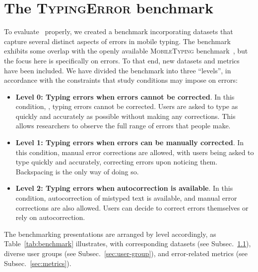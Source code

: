\section{The \textsc{TypingError} benchmark}
\label{Sec:benchmark}

To evaluate ~\name properly, we created a benchmark incorporating datasets that capture several distinct aspects of errors in mobile typing. 
The \benchmark benchmark exhibits some overlap with the  openly available \textsc{MobileTyping} benchmark~\cite{shi2024crtypist}, but the focus here is specifically on errors. 
To that end, new datasets and metrics have been included. 
We have divided the benchmark into three ``levels'', in accordance with the constraints that study conditions may impose on errors:

\begin{itemize}
    \item \textbf{Level 0: Typing errors when errors cannot be corrected}. In this condition, , typing errors cannot be corrected. Users are asked to type as quickly and accurately as possible without making any corrections. This allows researchers to observe the full range of errors that people make.
    \item \textbf{Level 1: Typing errors when errors can be manually corrected}. In this condition, manual error corrections are allowed, with users being asked to type quickly and accurately, correcting errors upon noticing them. Backspacing is the only way of doing so.
    \item \textbf{Level 2: Typing errors when autocorrection is available}. In this condition, autocorrection of mistyped text is available, and manual error corrections are also allowed. Users can decide to correct errors themselves or rely on autocorrection.
\end{itemize}

The benchmarking presentations are arranged by level accordingly, as Table~\ref{tab:benchmark} illustrates, with corresponding datasets (see Subsec.~\ref{sec:datasets}), diverse user groups (see Subsec.~\ref{sec:user-group}), and error-related metrics (see Subsec.~\ref{sec:metrics}).

\subsection{}
\label{sec:datasets}

